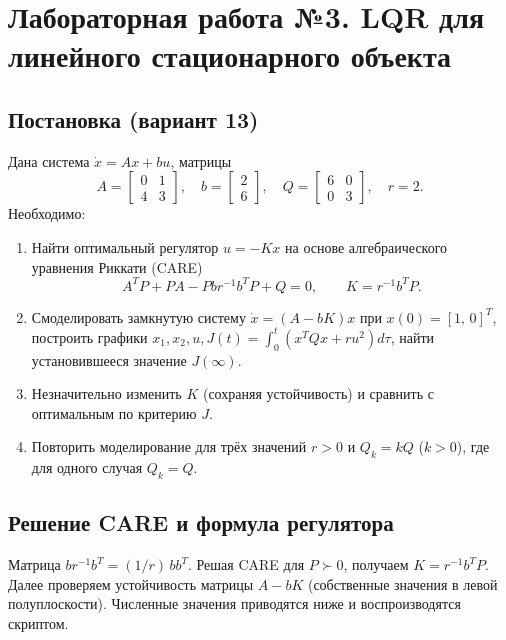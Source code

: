 \chapter{Лабораторная работа №3. LQR для линейного стационарного объекта}

\section*{Постановка (вариант 13)}
Дана система \(\dot x = A x + b u\), матрицы
\[
A=\begin{bmatrix}0&1\\4&3\end{bmatrix},\quad b=\begin{bmatrix}2\\6\end{bmatrix},\quad Q=\begin{bmatrix}6&0\\0&3\end{bmatrix},\quad r=2.
\]
Необходимо:
\begin{enumerate}
 \item Найти оптимальный регулятор \(u=-Kx\) на основе алгебраического уравнения Риккати (CARE)
 \[
  A^T P + P A - P b r^{-1} b^T P + Q = 0,\qquad K=r^{-1} b^T P.
 \]
 \item Смоделировать замкнутую систему \(\dot x=(A-bK)x\) при \(x(0)=[1,\,0]^T\), построить графики \(x_1, x_2, u, J(t)=\int_0^t (x^T Q x + r u^2)d\tau\), найти установившееся значение \(J(\infty)\).
 \item Незначительно изменить \(K\) (сохраняя устойчивость) и сравнить с оптимальным по критерию \(J\).
 \item Повторить моделирование для трёх значений \(r>0\) и \(Q_k=kQ\) (\(k>0\)), где для одного случая \(Q_k=Q\).
\end{enumerate}

\section{Решение CARE и формула регулятора}
Матрица \(b r^{-1} b^T = (1/r)\,b b^T\). Решая CARE для \(P\succ0\), получаем \(K=r^{-1} b^T P\). Далее проверяем устойчивость матрицы \(A-bK\) (собственные значения в левой полуплоскости). Численные значения приводятся ниже и воспроизводятся скриптом.

